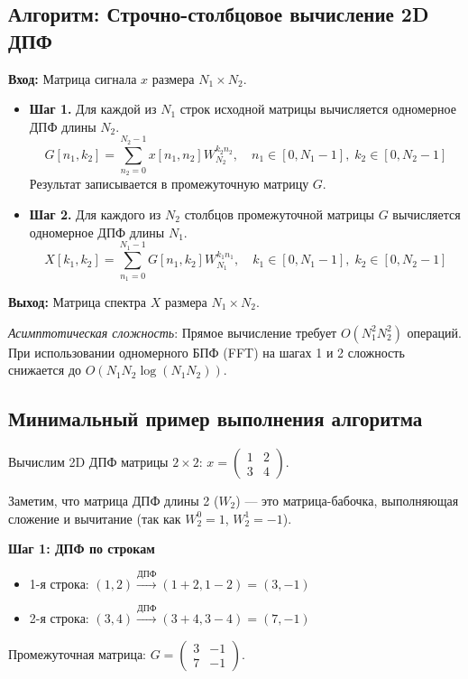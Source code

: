 \documentclass[12pt,a4paper]{article}
\begin{document}
\subsection*{Алгоритм: Строчно-столбцовое вычисление 2D ДПФ}
\textbf{Вход:} Матрица сигнала $x$ размера $N_1 \times N_2$.
\begin{itemize}[leftmargin=*]
    \item \textbf{Шаг 1.} Для каждой из $N_1$ строк исходной матрицы вычисляется одномерное ДПФ длины $N_2$.
    \begin{equation}
        G[n_1, k_2] = \sum_{n_2=0}^{N_2-1} x[n_1, n_2] W_{N_2}^{k_2 n_2}, \quad n_1 \in [0, N_1-1], \; k_2 \in [0, N_2-1]
    \end{equation}
    Результат записывается в промежуточную матрицу $G$.
    \item \textbf{Шаг 2.} Для каждого из $N_2$ столбцов промежуточной матрицы $G$ вычисляется одномерное ДПФ длины $N_1$.
    \begin{equation}
        X[k_1, k_2] = \sum_{n_1=0}^{N_1-1} G[n_1, k_2] W_{N_1}^{k_1 n_1}, \quad k_1 \in [0, N_1-1], \; k_2 \in [0, N_2-1]
    \end{equation}
\end{itemize}
\textbf{Выход:} Матрица спектра $X$ размера $N_1 \times N_2$.

\textit{Асимптотическая сложность}: Прямое вычисление требует $O(N_1^2 N_2^2)$ операций. При использовании одномерного БПФ (FFT) на шагах 1 и 2 сложность снижается до $O(N_1 N_2 \log(N_1 N_2))$.

\subsection*{Минимальный пример выполнения алгоритма}
Вычислим 2D ДПФ матрицы $2 \times 2$:
$ x = \begin{pmatrix} 1 & 2 \\ 3 & 4 \end{pmatrix} $.

Заметим, что матрица ДПФ длины 2 ($W_2$) — это матрица-бабочка, выполняющая сложение и вычитание (так как $W_2^0=1$, $W_2^1=-1$).

\textbf{Шаг 1: ДПФ по строкам}
\begin{itemize}
    \item 1-я строка: $(1, 2) \xrightarrow{ДПФ} (1+2, 1-2) = (3, -1)$
    \item 2-я строка: $(3, 4) \xrightarrow{ДПФ} (3+4, 3-4) = (7, -1)$
\end{itemize}
Промежуточная матрица: $ G = \begin{pmatrix} 3 & -1 \\ 7 & -1 \end{pmatrix} $.
\end{document}
